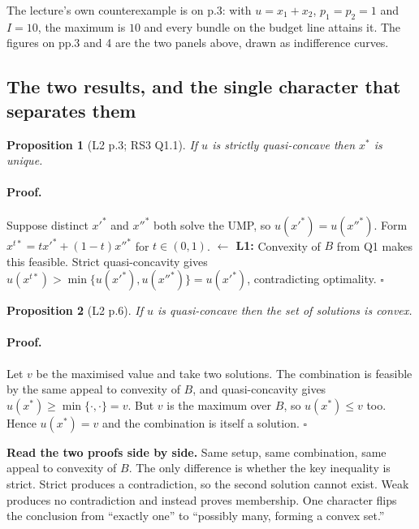 \documentclass[11pt]{article}
\newtheorem{proposition}{Proposition}
\theoremstyle{definition}
\newenvironment{keybox}{\begin{snugshade}\noindent\ignorespaces}{\end{snugshade}}
\newcommand{\xs}{x^*}
\newcommand{\back}[1]{\textbf{\small $\leftarrow$ L1:} \small #1}
\begin{document}
\vspace{4pt}
The lecture's own counterexample is on p.3: with $u=x_1+x_2$, $p_1=p_2=1$ and $I=10$, the
maximum is $10$ and every bundle on the budget line attains it. The figures on pp.3 and 4
are the two panels above, drawn as indifference curves.

\subsection{The two results, and the single character that separates them}

\begin{proposition}[L2 p.3; RS3 Q1.1]
If $u$ is strictly quasi-concave then $\xs$ is unique.
\end{proposition}

\paragraph{Proof.} Suppose distinct $x'^*$ and $x''^*$ both solve the UMP, so
$u(x'^*)=u(x''^*)$. Form $x^{t*}=tx'^*+(1-t)x''^*$ for $t\in(0,1)$. \back{Convexity of $B$
from Q1 makes this feasible.} Strict quasi-concavity gives
$u(x^{t*})>\min\{u(x'^*),u(x''^*)\}=u(x'^*)$, contradicting optimality. \hfill$\square$

\begin{proposition}[L2 p.6]
If $u$ is quasi-concave then the set of solutions is convex.
\end{proposition}

\paragraph{Proof.} Let $v$ be the maximised value and take two solutions. The combination
is feasible by the same appeal to convexity of $B$, and quasi-concavity gives
$u(\xs)\ge\min\{\cdot,\cdot\}=v$. But $v$ is the maximum over $B$, so $u(\xs)\le v$ too.
Hence $u(\xs)=v$ and the combination is itself a solution. \hfill$\square$

\begin{keybox}
\textbf{Read the two proofs side by side.} Same setup, same combination, same appeal to
convexity of $B$. The only difference is whether the key inequality is strict. Strict
produces a contradiction, so the second solution cannot exist. Weak produces no
contradiction and instead proves membership. One character flips the conclusion from
``exactly one'' to ``possibly many, forming a convex set.''
\end{keybox}
\end{document}
